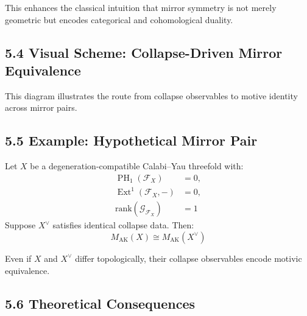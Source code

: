 \documentclass[11pt]{article}
\DeclareMathOperator{\Ext}{Ext}
\DeclareMathOperator{\PH}{PH}
\begin{document}
This enhances the classical intuition that mirror symmetry is not merely geometric but encodes categorical and cohomological duality.

\subsection{5.4 Visual Scheme: Collapse-Driven Mirror Equivalence}

\vspace{0.3em}

\begin{center}
\end{center}

\vspace{0.5em}

This diagram illustrates the route from collapse observables to motive identity across mirror pairs.

\subsection{5.5 Example: Hypothetical Mirror Pair}

Let $X$ be a degeneration-compatible Calabi–Yau threefold with:
\begin{align*}
\PH_1(\mathcal{F}_X) &= 0, \\
\Ext^1(\mathcal{F}_X, -) &= 0, \\
\mathrm{rank}(\mathcal{G}_{\mathcal{F}_X}) &= 1
\end{align*}
Suppose $X^{\vee}$ satisfies identical collapse data. Then:
\[
M_{\mathrm{AK}}(X) \cong M_{\mathrm{AK}}(X^{\vee})
\]

Even if $X$ and $X^{\vee}$ differ topologically, their collapse observables encode motivic equivalence.

\subsection{5.6 Theoretical Consequences}
\end{document}
